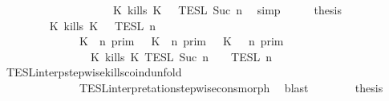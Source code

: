 \begin{isabellebody}
\ \ \ \ \ \ \ \ \ \ \ \ \ \ \ \ \ \ {\isasyminter}\ {\isasymlbrakk}{\isasymlbrakk}\ {\isacharparenleft}K\ kills\ K\ {\isacharhash}\ {\isasymPhi}\ {\isasymrbrakk}{\isasymrbrakk}\isactrlsub T\isactrlsub E\isactrlsub S\isactrlsub L\isactrlbsup {\isasymge}\ Suc\ n\isactrlesup {\isacartoucheclose}\ \isamarkupfalse%
\ simp\isanewline
\ \ \isamarkupfalse%
\ \isamarkupfalse%
\ {\isacharquery}thesis\isanewline
\ \ \ \ \isamarkupfalse%
\ {\isacharminus}\isanewline
\ \ \ \ \ \ \isamarkupfalse%
\ {\isacartoucheopen}{\isasymlbrakk}{\isasymlbrakk}\ {\isacharparenleft}K\ kills\ K\ {\isacharhash}\ {\isasymPsi}\ {\isasymrbrakk}{\isasymrbrakk}\isactrlsub T\isactrlsub E\isactrlsub S\isactrlsub L\isactrlbsup {\isasymge}\ n\isactrlesup \isanewline
\ \ \ \ \ \ \ \ \ \ \ \ {\isacharequal}\ {\isacharparenleft}{\isasymlbrakk}\ {\isacharparenleft}K\ {\isasymnot}{\isasymUp}\ n{\isacharparenright}\ {\isasymrbrakk}\isactrlsub p\isactrlsub r\isactrlsub i\isactrlsub m\ {\isasymunion}\ {\isasymlbrakk}\ {\isacharparenleft}K\ {\isasymUp}\ n{\isacharparenright}\ {\isasymrbrakk}\isactrlsub p\isactrlsub r\isactrlsub i\isactrlsub m\ {\isasyminter}\ {\isasymlbrakk}\ {\isacharparenleft}K\ {\isasymnot}{\isasymUp}\ {\isasymge}\ n{\isacharparenright}\ {\isasymrbrakk}\isactrlsub p\isactrlsub r\isactrlsub i\isactrlsub m{\isacharparenright}\isanewline
\ \ \ \ \ \ \ \ \ \ \ \ \ \ {\isasyminter}\ {\isasymlbrakk}\ {\isacharparenleft}K\ kills\ K\ {\isasymrbrakk}\isactrlsub T\isactrlsub E\isactrlsub S\isactrlsub L\isactrlbsup {\isasymge}\ Suc\ n\isactrlesup \ {\isasyminter}\ {\isasymlbrakk}{\isasymlbrakk}\ {\isasymPsi}\ {\isasymrbrakk}{\isasymrbrakk}\isactrlsub T\isactrlsub E\isactrlsub S\isactrlsub L\isactrlbsup {\isasymge}\ n\isactrlesup {\isacartoucheclose}\isanewline
\ \ \ \ \ \ \ \ \isamarkupfalse%
\ TESL{\isacharunderscore}interp{\isacharunderscore}stepwise{\isacharunderscore}kills{\isacharunderscore}coind{\isacharunderscore}unfold\isanewline
\ \ \ \ \ \ \ \ \ \ \ \ \ \ TESL{\isacharunderscore}interpretation{\isacharunderscore}stepwise{\isacharunderscore}cons{\isacharunderscore}morph\ \isamarkupfalse%
\ blast\isanewline
\ \ \ \ \ \ \isamarkupfalse%
\ {\isacharquery}thesis\ \isamarkupfalse%

\end{isabellebody}
